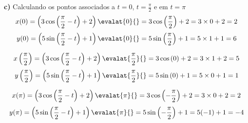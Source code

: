 \documentclass[a4paper,12pt,fleqn]{article}
\begin{document}
\begin{answer}
\bigskip
\textbf{c)} \quad
Calculando os pontos associados a $t=0$, $t=\frac{\pi}{2}$ e em $t=\pi$
\[
  x(0)
  = \left(3 \cos\left(\frac{\pi}{2}-t\right) + 2\right)\evalat{0}{}
  = 3 \cos\left(\frac{\pi}{2}\right) + 2
  = 3 \times 0 + 2
  = 2
\]
\[
  y(0)
  = \left(5 \sin\left(\frac{\pi}{2}-t\right) + 1\right)\evalat{0}{}
  = 5 \sin\left(\frac{\pi}{2}\right) + 1
  = 5 \times 1 + 1
  = 6
\]

\medskip
\[
  x\left(\frac{\pi}{2}\right)
  = \left(3 \cos\left(\frac{\pi}{2}-t\right) + 2\right)\evalat{\frac{\pi}{2}}{}
  = 3 \cos\left(0\right) + 2
  = 3 \times 1 + 2
  = 5
\]
\[
  y\left(\frac{\pi}{2}\right)
  = \left(5 \sin\left(\frac{\pi}{2}-t\right) + 1\right)\evalat{\frac{\pi}{2}}{}
  = 5 \sin\left(0\right) + 1
  = 5 \times 0 + 1
  = 1
\]

\medskip
\[
  x(\pi)
  = \left(3 \cos\left(\frac{\pi}{2}-t\right) + 2\right)\evalat{\pi}{}
  = 3 \cos\left(-\frac{\pi}{2}\right) + 2
  = 3 \times 0 + 2
  = 2
\]
\[
  y(\pi)
  = \left(5 \sin\left(\frac{\pi}{2}-t\right) + 1\right)\evalat{\pi}{}
  = 5 \sin\left(-\frac{\pi}{2}\right) + 1
  = 5 (-1) + 1
  = -4
\]
\end{answer}
\end{document}

